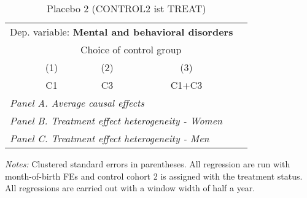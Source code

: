  \begin{table}[H] \centering \begin{threeparttable} \caption{Placebo 2 (CONTROL2 ist TREAT) } {\def\sym#1{\ifmmode^{#1}\else\(^{#1}\)\fi} \begin{tabular}{l*{4}{c}} \toprule \multicolumn{4}{l}{Dep. variable: \textbf{Mental and behavioral disorders}} \\ & \multicolumn{3}{c}{Choice of control group} \\ \cmidrule(lr){2-4}
            &\multicolumn{1}{c}{(1)}&\multicolumn{1}{c}{(2)}&\multicolumn{1}{c}{(3)}\\
            &\multicolumn{1}{c}{C1}&\multicolumn{1}{c}{C3}&\multicolumn{1}{c}{C1+C3}\\
\midrule
 \multicolumn{4}{l}{\emph{Panel A. Average causal effects}} \\      \midrule\multicolumn{4}{l}{\emph{Panel B. Treatment effect heterogeneity - Women}} \\      \midrule\multicolumn{4}{l}{\emph{Panel C. Treatment effect heterogeneity - Men}} \\      
\bottomrule \end{tabular} } \begin{tablenotes} \item \scriptsize \emph{Notes:} Clustered standard errors in parentheses. All regression are run with month-of-birth FEs and control cohort 2 is assigned with the treatment status. All regressions are carried out with a window width of half a year. \end{tablenotes} \end{threeparttable} \end{table} 
